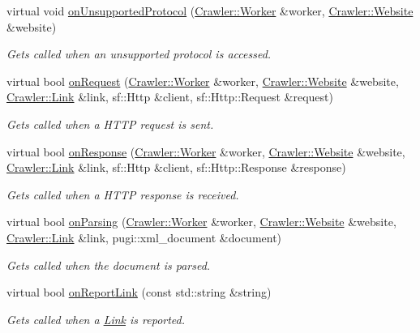 \begin{DoxyCompactItemize}
virtual void \hyperlink{class_crawler_1_1_application_af9735a84f3ed01419a14e9dc584bd238}{on\+Unsupported\+Protocol} (\hyperlink{class_crawler_1_1_worker}{Crawler\+::\+Worker} \&worker, \hyperlink{class_crawler_1_1_website}{Crawler\+::\+Website} \&website)
\begin{DoxyCompactList}\small\item\em Gets called when an unsupported protocol is accessed. \end{DoxyCompactList}\item 
virtual bool \hyperlink{class_crawler_1_1_application_a1d3c8c2d7f226d33601e96ede098976a}{on\+Request} (\hyperlink{class_crawler_1_1_worker}{Crawler\+::\+Worker} \&worker, \hyperlink{class_crawler_1_1_website}{Crawler\+::\+Website} \&website, \hyperlink{class_crawler_1_1_link}{Crawler\+::\+Link} \&link, sf\+::\+Http \&client, sf\+::\+Http\+::\+Request \&request)
\begin{DoxyCompactList}\small\item\em Gets called when a H\+T\+T\+P request is sent. \end{DoxyCompactList}\item 
virtual bool \hyperlink{class_crawler_1_1_application_af1ad5bb1ae7ce57444e5a234fe0582a8}{on\+Response} (\hyperlink{class_crawler_1_1_worker}{Crawler\+::\+Worker} \&worker, \hyperlink{class_crawler_1_1_website}{Crawler\+::\+Website} \&website, \hyperlink{class_crawler_1_1_link}{Crawler\+::\+Link} \&link, sf\+::\+Http \&client, sf\+::\+Http\+::\+Response \&response)
\begin{DoxyCompactList}\small\item\em Gets called when a H\+T\+T\+P response is received. \end{DoxyCompactList}\item 
virtual bool \hyperlink{class_crawler_1_1_application_a43048018281b44cedeb943d856c2bbad}{on\+Parsing} (\hyperlink{class_crawler_1_1_worker}{Crawler\+::\+Worker} \&worker, \hyperlink{class_crawler_1_1_website}{Crawler\+::\+Website} \&website, \hyperlink{class_crawler_1_1_link}{Crawler\+::\+Link} \&link, pugi\+::xml\+\_\+document \&document)
\begin{DoxyCompactList}\small\item\em Gets called when the document is parsed. \end{DoxyCompactList}\item 
virtual bool \hyperlink{class_crawler_1_1_application_acb987ee8ae6f0e6e7f9b1092dd7a4f3f}{on\+Report\+Link} (const std\+::string \&string)
\begin{DoxyCompactList}\small\item\em Gets called when a \hyperlink{class_crawler_1_1_link}{Link} is reported. \end{DoxyCompactList}\item 

\end{DoxyCompactItemize}
